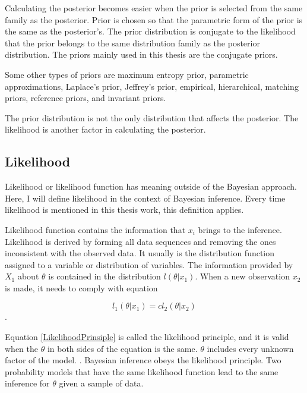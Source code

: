 Calculating the posterior becomes easier when the prior is selected from the same family as the posterior. Prior is chosen so that the parametric form of the prior is the same as the posterior's. The prior distribution is conjugate to the likelihood that the prior belongs to the same distribution family as the posterior distribution. \cite{SUGIYAMA2016185} The priors mainly used in this thesis are the conjugate priors.

Some other types of priors are maximum entropy prior, parametric approximations, Laplace's prior, Jeffrey's prior, empirical, hierarchical, matching priors, reference priors, and invariant priors. \cite{Robert2007TheBC}

The prior distribution is not the only distribution that affects the posterior. The likelihood is another factor in calculating the posterior.

\subsection{Likelihood}\label{Likelihood}
Likelihood or likelihood function has meaning outside of the Bayesian approach. Here, I will define likelihood in the context of Bayesian inference. Every time likelihood is mentioned in this thesis work, this definition applies. 

Likelihood function contains the information that $x_i$ brings to the inference. \cite{Robert2007TheBC} Likelihood is derived by forming all data sequences and removing the ones inconsistent with the observed data. It usually is the distribution function assigned to a variable or distribution of variables. \cite{Mcelreath2015StatisticalRA} The information provided by $X_1$ about $\theta$ is contained in the distribution $l(\theta|x_1)$. When a new observation $x_2$ is made, it needs to comply with equation

\begin{equation}\label{LikelihoodPrinsiple}
l_1(\theta|x_1) = cl_2(\theta|x_2)
\end{equation}\cite{Robert2007TheBC}.

Equation \ref{LikelihoodPrinsiple} is called the likelihood principle, and it is valid when the $\theta$ in both sides of the equation is the same. $\theta$ includes every unknown factor of the model. \cite{Robert2007TheBC}. Bayesian inference obeys the likelihood principle. Two probability models that have the same likelihood function lead to the same inference for $\theta$ given a sample of data.\cite{Gel2014BayesianDA}

